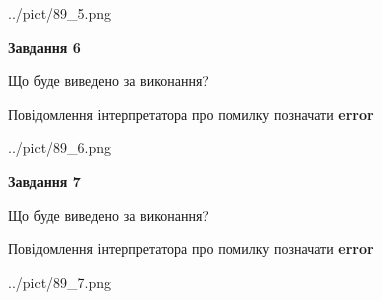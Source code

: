 \documentclass[10pt, ukrainian]{article}
\begin{document}
{\begin {large}
\begin{center}
	{../pict/89_5.png}
\end{center}
\newpage

{\begin {center}\textbf{Завдання 6}\end {center}}\par
Що буде виведено за виконання? \par
Повідомлення інтерпретатора про помилку позначати \textbf{error}

\begin{center}
	{../pict/89_6.png}
\end{center}
\newpage

{\begin {center}\textbf{Завдання 7}\end {center}}\par
Що буде виведено за виконання? \par
Повідомлення інтерпретатора про помилку позначати \textbf{error}

\begin{center}
	{../pict/89_7.png}
\end{center}
\newpage

\end {large}}
\end{document}
